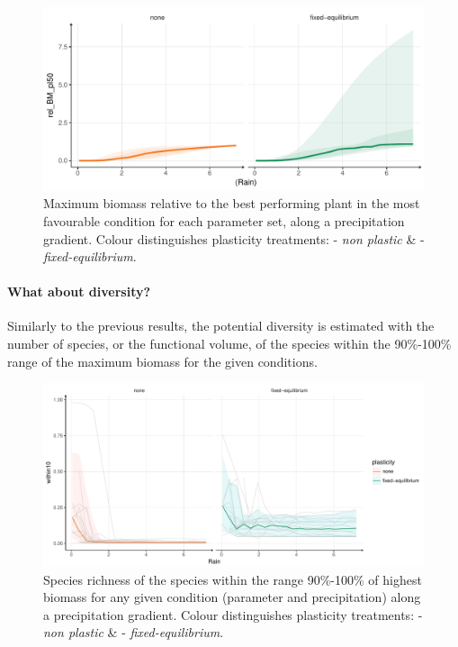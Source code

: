\begin{figure}\label{fig:maximum_BM}
\includegraphics[width = \textwidth]{./2_PP/Figures/Rain/gradient_rel_BM_pl_trend.pdf}
\caption[Maximum biomass relative along a precipitation gradient]{Maximum biomass relative to the best performing plant in the most favourable condition for each parameter set, along a precipitation gradient.  Colour distinguishes plasticity treatments: \textcolor{myOrange}{- \textit{non plastic}} \&  \textcolor{myGreen}{- \textit{fixed-equilibrium}}.}
\end{figure}


\paragraph{What about diversity?}

Similarly to the previous results, the potential diversity is estimated with the number of species, or the functional volume, of the species within the 90\%-100\% range of the maximum biomass for the given conditions.

\begin{figure}\label{fig:species_richness_grad}
\includegraphics[width = \textwidth]{./2_PP/Figures/Rain/gradient_plot_spdiv10.pdf}
\caption[Species richness of the best performing species along a precipitation gradient]{Species richness of the species within the range 90\%-100\% of highest biomass for any given condition (parameter and precipitation) along a precipitation gradient.  Colour distinguishes plasticity treatments: \textcolor{myOrange}{- \textit{non plastic}} \&  \textcolor{myGreen}{- \textit{fixed-equilibrium}}.} \end{figure}

